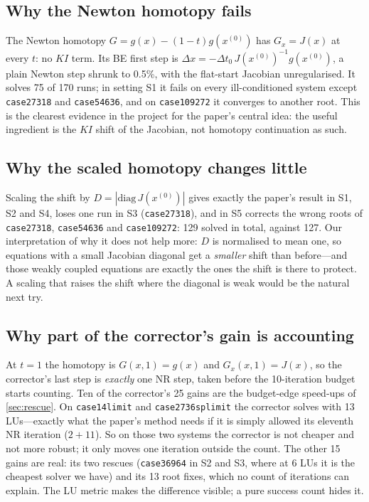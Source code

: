 \documentclass[11pt,a4paper]{article}
\newcommand{\xo}{x^{(0)}}
\newcommand{\code}[1]{\texttt{#1}}
\begin{document}
\subsection{Why the Newton homotopy fails}
The Newton homotopy $G=g(x)-(1-t)g(\xo)$ has $G_x=J(x)$ at every $t$: no $KI$ term. Its BE first step is
$\Delta x=-\Delta t_0\,J(\xo)^{-1}g(\xo)$, a plain Newton step shrunk to 0.5\%, with the flat-start Jacobian
unregularised. It solves 75 of 170 runs; in setting S1 it fails on every ill-conditioned system except
\code{case27318} and \code{case54636}, and on \code{case109272} it converges to another root. This is the
clearest evidence in the project for the paper's central idea: the useful ingredient is the $KI$ shift of
the Jacobian, not homotopy continuation as such.

\subsection{Why the scaled homotopy changes little}
Scaling the shift by $D=|\mathrm{diag}\,J(\xo)|$ gives exactly the paper's result in S1, S2 and S4, loses one
run in S3 (\code{case27318}), and in S5 corrects the wrong roots of \code{case27318}, \code{case54636} and
\code{case109272}: 129 solved in total, against 127. Our interpretation of why it does not help more: $D$ is
normalised to mean one, so equations with a small Jacobian diagonal get a \emph{smaller} shift than
before---and those weakly coupled equations are exactly the ones the shift is there to protect. A scaling
that raises the shift where the diagonal is weak would be the natural next try.

\subsection{Why part of the corrector's gain is accounting}\label{sec:pc-accounting}
At $t=1$ the homotopy is $G(x,1)=g(x)$ and $G_x(x,1)=J(x)$, so the corrector's last step is \emph{exactly}
one NR step, taken before the 10-iteration budget starts counting. Ten of the corrector's 25 gains are the
budget-edge speed-ups of \cref{sec:rescue}. On \code{case14limit} and \code{case2736splimit} the corrector
solves with 13 LUs---exactly what the paper's method needs if it is simply allowed its eleventh NR iteration
($2+11$). So on those two systems the corrector is not cheaper and not more robust; it only moves one
iteration outside the count. The other 15 gains are real: its two rescues (\code{case36964} in S2 and S3,
where at 6 LUs it is the cheapest solver we have) and its 13 root fixes, which no count of iterations can
explain. The LU metric makes the difference visible; a pure success count hides it.
\end{document}
